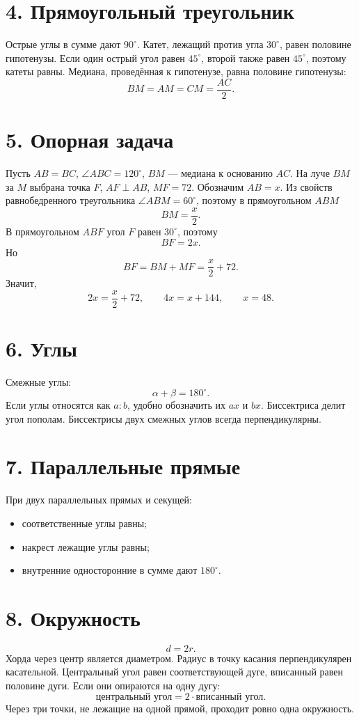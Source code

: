 \documentclass[a4paper,12pt]{article}
\begin{document}
\section*{\color{darkaccent}4. Прямоугольный треугольник}
Острые углы в сумме дают $90^\circ$.
Катет, лежащий против угла $30^\circ$, равен половине гипотенузы.
Если один острый угол равен $45^\circ$, второй также равен $45^\circ$, поэтому катеты равны.
Медиана, проведённая к гипотенузе, равна половине гипотенузы:
\[
BM=AM=CM=\frac{AC}{2}.
\]

\section*{\color{darkaccent}5. Опорная задача}
Пусть $AB=BC$, $\angle ABC=120^\circ$, $BM$ --- медиана к основанию $AC$. На луче $BM$ за $M$ выбрана точка $F$, $AF\perp AB$, $MF=72$. Обозначим $AB=x$.
Из свойств равнобедренного треугольника $\angle ABM=60^\circ$, поэтому в прямоугольном $ABM$
\[
BM=\frac{x}{2}.
\]
В прямоугольном $ABF$ угол $F$ равен $30^\circ$, поэтому
\[
BF=2x.
\]
Но
\[
BF=BM+MF=\frac{x}{2}+72.
\]
Значит,
\[
2x=\frac{x}{2}+72,\qquad 4x=x+144,\qquad x=48.
\]

\section*{\color{darkaccent}6. Углы}
Смежные углы:
\[
\alpha+\beta=180^\circ.
\]
Если углы относятся как $a:b$, удобно обозначить их $ax$ и $bx$.
Биссектриса делит угол пополам.
Биссектрисы двух смежных углов всегда перпендикулярны.

\section*{\color{darkaccent}7. Параллельные прямые}
При двух параллельных прямых и секущей:
\begin{itemize}
\item соответственные углы равны;
\item накрест лежащие углы равны;
\item внутренние односторонние в сумме дают $180^\circ$.
\end{itemize}

\section*{\color{darkaccent}8. Окружность}
\[
d=2r.
\]
Хорда через центр является диаметром. Радиус в точку касания перпендикулярен касательной.
Центральный угол равен соответствующей дуге, вписанный равен половине дуги. Если они опираются на одну дугу:
\[
\boxed{\text{центральный угол}=2\cdot\text{вписанный угол}}.
\]
Через три точки, не лежащие на одной прямой, проходит ровно одна окружность.
\end{document}
